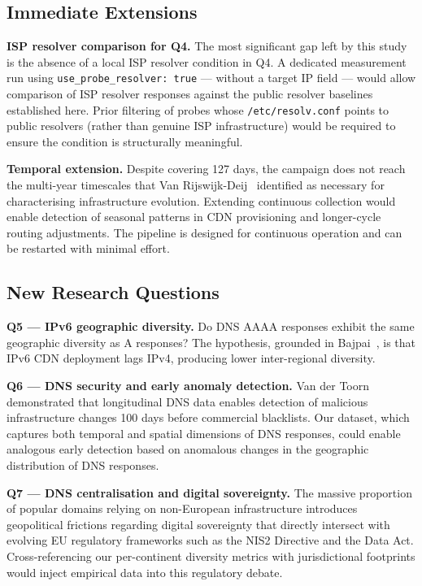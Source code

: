 \bigskip
\subsection{Immediate Extensions}
\label{subsec:5.4.1}

\textbf{\ac{ISP} resolver comparison for Q4.} The most significant gap left by this study is the absence of a local \ac{ISP} resolver condition in Q4. A dedicated measurement run using \texttt{use\_probe\_resolver: true} --- without a target \ac{IP} field --- would allow comparison of \ac{ISP} resolver responses against the public resolver baselines established here. Prior filtering of probes whose \texttt{/etc/resolv.conf} points to public resolvers (rather than genuine \ac{ISP} infrastructure) would be required to ensure the condition is structurally meaningful.

\textbf{Temporal extension.} Despite covering 127 days, the campaign does not reach the multi-year timescales that Van Rijswijk-Deij~\cite{vanRijswijk2016} identified as necessary for characterising infrastructure evolution. Extending continuous collection would enable detection of seasonal patterns in \ac{CDN} provisioning and longer-cycle routing adjustments. The pipeline is designed for continuous operation and can be restarted with minimal effort.

\bigskip
\subsection{New Research Questions}
\label{subsec:5.4.2}

\textbf{Q5 --- \ac{IPv6} geographic diversity.} Do \ac{DNS} \ac{AAAA} responses exhibit the same geographic diversity as \ac{A} responses? The hypothesis, grounded in Bajpai~\cite{Bajpai2017}, is that \ac{IPv6} \ac{CDN} deployment lags \ac{IPv4}, producing lower inter-regional diversity.

\textbf{Q6 --- \ac{DNS} security and early anomaly detection.} Van der Toorn~\cite{vanderToorn2018} demonstrated that longitudinal \ac{DNS} data enables detection of malicious infrastructure changes 100 days before commercial blacklists. Our dataset, which captures both temporal and spatial dimensions of \ac{DNS} responses, could enable analogous early detection based on anomalous changes in the geographic distribution of \ac{DNS} responses.

\textbf{Q7 --- \ac{DNS} centralisation and digital sovereignty.} The massive proportion of popular domains relying on non-European infrastructure introduces geopolitical frictions regarding digital sovereignty that directly intersect with evolving EU regulatory frameworks such as the NIS2 Directive and the Data Act. Cross-referencing our per-continent diversity metrics with jurisdictional footprints would inject empirical data into this regulatory debate.

